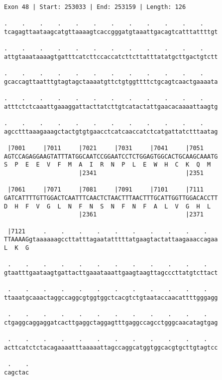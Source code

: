 \documentclass{article}
\begin{document}
\begin{Verbatim}[fontfamily=courier]
Exon 48 | Start: 253033 | End: 253159 | Length: 126

.    .    .    .    .    .    .    .    .    .    .    .    
tcagagttaataagcatgttaaaagtcaccgggatgtaaattgacagtcatttattttgt

.    .    .    .    .    .    .    .    .    .    .    .    
attgtaaataaaagtgatttcatcttccaccatcttcttatttatatgcttgactgtctt

.    .    .    .    .    .    .    .    .    .    .    .    
gcaccagttaatttgtagtagctaaaatgttctgtggttttctgcagtcaactgaaaata

.    .    .    .    .    .    .    .    .    .    .    .    
atttctctcaaattgaaaggattacttatcttgtcatactattgaacacaaaattaagtg

.    .    .    .    .    .    .    .    .    .    .    .    
agcctttaaagaaagctactgtgtgaacctcatcaaccatctcatgattatctttaatag

 |7001     |7011     |7021     |7031     |7041     |7051    
AGTCCAGAGGAAGTATTTATGGCAATCCGGAATCCTCTGGAGTGGCACTGCAAGCAAATG
S  P  E  E  V  F  M  A  I  R  N  P  L  E  W  H  C  K  Q  M  
                     |2341                         |2351    

 |7061     |7071     |7081     |7091     |7101     |7111    
GATCATTTTGTTGGACTCAATTTCAACTCTAACTTTAACTTTGCATTGGTTGGACACCTT
D  H  F  V  G  L  N  F  N  S  N  F  N  F  A  L  V  G  H  L  
                     |2361                         |2371    

 |7121     .    .    .    .    .    .    .    .    .    .   
TTAAAAGgtaaaaaagccttatttagaatatttttatgaagtactattaagaaaccagaa
L  K  G                                                     

 .    .    .    .    .    .    .    .    .    .    .    .   
gtaatttgaataagtgattacttgaaataaattgaagtaagttagcccttatgtcttact

 .    .    .    .    .    .    .    .    .    .    .    .   
ttaaatgcaaactaggccaggcgtggtggctcacgtctgtaataccaacattttgggagg

 .    .    .    .    .    .    .    .    .    .    .    .   
ctgaggcaggaggatcacttgaggctaggagtttgaggccagcctgggcaacatagtgag

 .    .    .    .    .    .    .    .    .    .    .    .   
acttcatctctacagaaaatttaaaaattagccaggcatggtggcacgtgcttgtagtcc

 .    .
cagctac
\end{Verbatim}
\newpage
\end{document}
